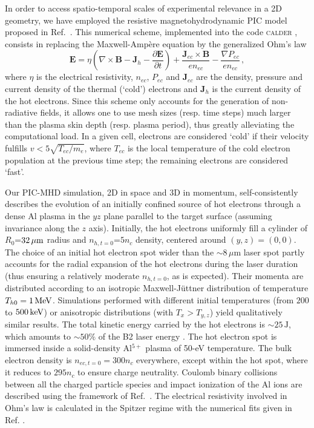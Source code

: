 \documentclass[aps,twocolumn,showpacs,superscriptaddress]{revtex4}
\begin{document}
In order to access spatio-temporal scales of experimental relevance in a 2D geometry, we have employed the resistive magnetohydrodynamic PIC model proposed in
\mbox{Ref.~\cite{JCP_Cohen_2010}}. This numerical scheme, implemented into the code \textsc{calder} \cite{NF_Lefebvre_2003}, consists in replacing the Maxwell-Amp\`ere equation
by the generalized Ohm's law
\begin{equation} \label{eq:PICMHD}
  \mathbf{E}=\eta \left(\nabla \times \mathbf{B}-\mathbf{J}_{h}-\frac{\partial \mathbf{E}}{\partial t}\right)+\frac{\mathbf{J}_{ec}\times \mathbf{B}}{en_{ec}}
  -\frac{\nabla P_{ec}}{en_{ec}} \,,
\end{equation}
where $\eta$ is the electrical resistivity, $n_{ec}$, $P_{ec}$ and $\mathbf{J}_{ec}$ are the density, pressure and current density of the thermal (`cold') electrons and $\mathbf{J}_h$ is the current density of the hot electrons. Since this scheme only accounts for the generation of non-radiative fields, it allows one to use mesh sizes (resp. time steps) much larger than the plasma skin depth (resp. plasma period), thus greatly alleviating the computational load. In a given cell, electrons are considered `cold' if their velocity fulfills $v<5\sqrt{T_{ec}/m_e}$, where $T_{ec}$ is the local temperature of the cold electron population
at the previous time step; the remaining electrons are considered `fast'.

Our PIC-MHD simulation, 2D in space and 3D in momentum, self-consistently describes the evolution of an initially confined source of hot electrons through a dense Al plasma in the $yz$ plane parallel to the target surface (assuming invariance along the $z$ axis). Initially, the hot electrons uniformly fill a cylinder of
$R_{0}$=$32\,\rm \mu m$ radius and $n_{h,t=0}$=$5n_c$ density, centered around $(y,z)=(0,0)$. The choice of an initial hot electron spot wider than the $\sim 8\,\mu\mathrm{m}$ laser spot partly accounts for the radial expansion of the hot electrons during the laser duration \cite{PRE_Stephens_2004} (thus ensuring a relatively moderate $n_{h,t=0}$, as is expected). Their momenta are distributed according to an isotropic Maxwell-J\"uttner distribution of temperature $T_{h0}=1\,\rm MeV$. Simulations performed with different initial temperatures (from $200$ to $500\,\rm keV$) or anisotropic distributions (with $T_x>T_{y,z}$) yield qualitatively similar results. The total kinetic energy carried by the hot electrons is $\sim 25\,\mathrm{J}$, which amounts to $\sim 50\%$ of the B2 laser energy \cite{PRL_Ping_2008}. The hot electron spot is immersed inside a solid-density Al$^{5+}$ plasma of \mbox{50-eV} temperature. The bulk electron density is $n_{ec,t=0}=300n_c$ everywhere, except within the hot spot, where it reduces to $295n_c$ to ensure charge neutrality. Coulomb binary collisions between all the charged particle species and impact ionization of the Al ions are described using the framework of \mbox{Ref.~\cite{POP_Perez_2012}}. The electrical resistivity involved in Ohm's law is calculated in the Spitzer regime with the numerical fits given in Ref. \cite{Decoster_1998}. 
\end{document}
